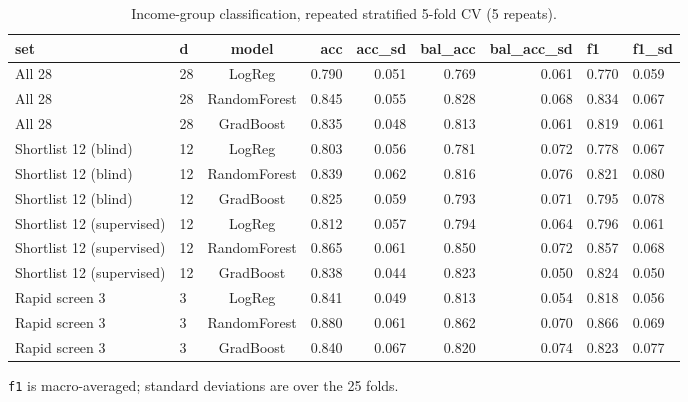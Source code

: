 \begin{table}[t]
\centering
\caption{Income-group classification, repeated stratified 5-fold CV (5 repeats).}
\label{tab:classification}
\small
\begin{tabular}{llcrrrr}
\toprule
\textbf{set} & \textbf{d} & \textbf{model} & \textbf{acc} & \textbf{acc_sd} & \textbf{bal_acc} & \textbf{bal_acc_sd} & \textbf{f1} & \textbf{f1_sd} \\
\midrule
All 28 & 28 & LogReg & 0.790 & 0.051 & 0.769 & 0.061 & 0.770 & 0.059 \\
All 28 & 28 & RandomForest & 0.845 & 0.055 & 0.828 & 0.068 & 0.834 & 0.067 \\
All 28 & 28 & GradBoost & 0.835 & 0.048 & 0.813 & 0.061 & 0.819 & 0.061 \\
Shortlist 12 (blind) & 12 & LogReg & 0.803 & 0.056 & 0.781 & 0.072 & 0.778 & 0.067 \\
Shortlist 12 (blind) & 12 & RandomForest & 0.839 & 0.062 & 0.816 & 0.076 & 0.821 & 0.080 \\
Shortlist 12 (blind) & 12 & GradBoost & 0.825 & 0.059 & 0.793 & 0.071 & 0.795 & 0.078 \\
Shortlist 12 (supervised) & 12 & LogReg & 0.812 & 0.057 & 0.794 & 0.064 & 0.796 & 0.061 \\
Shortlist 12 (supervised) & 12 & RandomForest & 0.865 & 0.061 & 0.850 & 0.072 & 0.857 & 0.068 \\
Shortlist 12 (supervised) & 12 & GradBoost & 0.838 & 0.044 & 0.823 & 0.050 & 0.824 & 0.050 \\
Rapid screen 3 & 3 & LogReg & 0.841 & 0.049 & 0.813 & 0.054 & 0.818 & 0.056 \\
Rapid screen 3 & 3 & RandomForest & 0.880 & 0.061 & 0.862 & 0.070 & 0.866 & 0.069 \\
Rapid screen 3 & 3 & GradBoost & 0.840 & 0.067 & 0.820 & 0.074 & 0.823 & 0.077 \\
\bottomrule
\end{tabular}
\vspace{2pt}\parbox{0.92\linewidth}{\footnotesize \texttt{f1} is macro-averaged; standard deviations are over the 25 folds.}
\end{table}
